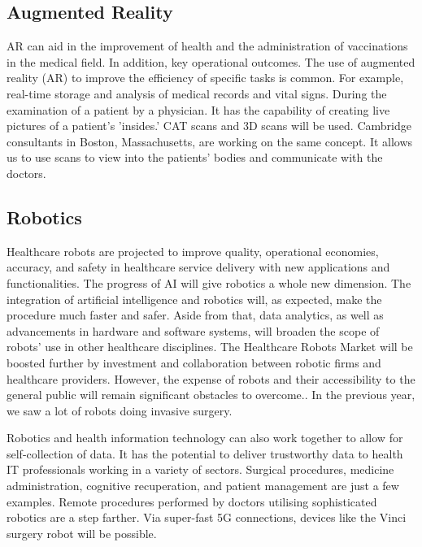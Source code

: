 \documentclass[12pt]{article}
\begin{document}
\subsection{Augmented Reality}
AR can aid in the improvement of health and the administration of vaccinations in the medical field. In addition, key operational outcomes. The use of augmented reality (AR) to improve the efficiency of specific tasks is common. For example, real-time storage and analysis of medical records and vital signs. During the examination of a patient by a physician. It has the capability of creating live pictures of a patient's 'insides.' CAT scans and 3D scans will be used. Cambridge consultants in Boston, Massachusetts, are working on the same concept. It allows us to use scans to view into the patients' bodies and communicate with the doctors.

\subsection{Robotics}
Healthcare robots are projected to improve quality, operational economies, accuracy, and safety in healthcare service delivery with new applications and functionalities. The progress of AI will give robotics a whole new dimension. The integration of artificial intelligence and robotics will, as expected, make the procedure much faster and safer. Aside from that, data analytics, as well as advancements in hardware and software systems, will broaden the scope of robots' use in other healthcare disciplines. The Healthcare Robots Market will be boosted further by investment and collaboration between robotic firms and healthcare providers. However, the expense of robots and their accessibility to the general public will remain significant obstacles to overcome.. In the previous year, we saw a lot of robots doing invasive surgery.

Robotics and health information technology can also work together to allow for self-collection of data. It has the potential to deliver trustworthy data to health IT professionals working in a variety of sectors. Surgical procedures, medicine administration, cognitive recuperation, and patient management are just a few examples. Remote procedures performed by doctors utilising sophisticated robotics are a step farther. Via super-fast 5G connections, devices like the Vinci surgery robot will be possible.
\end{document}
